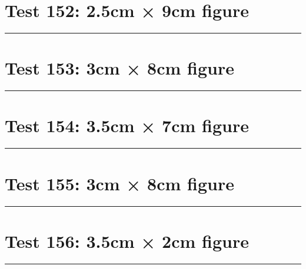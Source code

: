 \documentclass[a4paper,11pt]{article}
\begin{document}
\section*{Test 152: 2.5cm × 9cm figure}
\begin{swarmwrap}%
  \begin{minipage}[t]{2cm}
    \centering
    \rule{\linewidth}{9cm}
  \end{minipage}%
\end{swarmwrap}%
\swarmwrapnext
\lipsum[14]
\lipsum[15]
\lipsum[16]
\lipsum[17]
\section*{Test 153: 3cm × 8cm figure}
\begin{swarmwrap}%
  \begin{minipage}[t]{3cm}
    \centering
    \rule{\linewidth}{8cm}
  \end{minipage}%
\end{swarmwrap}%
\swarmwrapnext
\lipsum[56]
\lipsum[57]
\lipsum[58]
\lipsum[59]
\lipsum[60]
\section*{Test 154: 3.5cm × 7cm figure}
\begin{swarmwrap}%
  \begin{minipage}[t]{3cm}
    \centering
    \rule{\linewidth}{7cm}
  \end{minipage}%
\end{swarmwrap}%
\swarmwrapnext
\lipsum[99]
\lipsum[100]
\lipsum[101]
\lipsum[102]
\lipsum[103]
\section*{Test 155: 3cm × 8cm figure}
\begin{swarmwrap}%
  \begin{minipage}[t]{3cm}
    \centering
    \rule{\linewidth}{8cm}
  \end{minipage}%
\end{swarmwrap}%
\swarmwrapnext
\lipsum[22]
\lipsum[23]
\lipsum[24]
\lipsum[25]
\lipsum[26]
\section*{Test 156: 3.5cm × 2cm figure}
\begin{swarmwrap}%
  \begin{minipage}[t]{3cm}
    \centering
    \rule{\linewidth}{2cm}
  \end{minipage}%
\end{swarmwrap}%
\swarmwrapnext
\lipsum[91]
\lipsum[92]
\lipsum[93]
\end{document}
